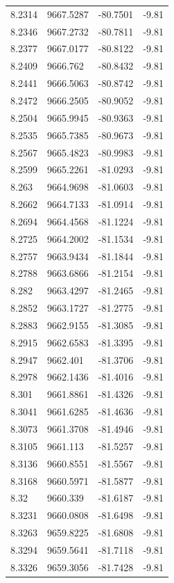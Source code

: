 \begin{table}[H]
\begin{tabular}{llll}
8.2314 & 9667.5287 & -80.7501 & -9.81 \\
8.2346 & 9667.2732 & -80.7811 & -9.81 \\
8.2377 & 9667.0177 & -80.8122 & -9.81 \\
8.2409 & 9666.762 & -80.8432 & -9.81 \\
8.2441 & 9666.5063 & -80.8742 & -9.81 \\
8.2472 & 9666.2505 & -80.9052 & -9.81 \\
8.2504 & 9665.9945 & -80.9363 & -9.81 \\
8.2535 & 9665.7385 & -80.9673 & -9.81 \\
8.2567 & 9665.4823 & -80.9983 & -9.81 \\
8.2599 & 9665.2261 & -81.0293 & -9.81 \\
8.263 & 9664.9698 & -81.0603 & -9.81 \\
8.2662 & 9664.7133 & -81.0914 & -9.81 \\
8.2694 & 9664.4568 & -81.1224 & -9.81 \\
8.2725 & 9664.2002 & -81.1534 & -9.81 \\
8.2757 & 9663.9434 & -81.1844 & -9.81 \\
8.2788 & 9663.6866 & -81.2154 & -9.81 \\
8.282 & 9663.4297 & -81.2465 & -9.81 \\
8.2852 & 9663.1727 & -81.2775 & -9.81 \\
8.2883 & 9662.9155 & -81.3085 & -9.81 \\
8.2915 & 9662.6583 & -81.3395 & -9.81 \\
8.2947 & 9662.401 & -81.3706 & -9.81 \\
8.2978 & 9662.1436 & -81.4016 & -9.81 \\
8.301 & 9661.8861 & -81.4326 & -9.81 \\
8.3041 & 9661.6285 & -81.4636 & -9.81 \\
8.3073 & 9661.3708 & -81.4946 & -9.81 \\
8.3105 & 9661.113 & -81.5257 & -9.81 \\
8.3136 & 9660.8551 & -81.5567 & -9.81 \\
8.3168 & 9660.5971 & -81.5877 & -9.81 \\
8.32 & 9660.339 & -81.6187 & -9.81 \\
8.3231 & 9660.0808 & -81.6498 & -9.81 \\
8.3263 & 9659.8225 & -81.6808 & -9.81 \\
8.3294 & 9659.5641 & -81.7118 & -9.81 \\
8.3326 & 9659.3056 & -81.7428 & -9.81 \\

\end{tabular}
\end{table}
